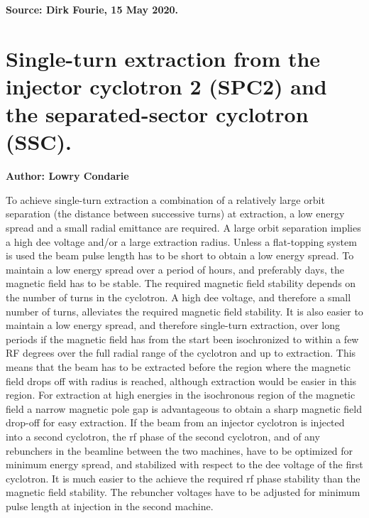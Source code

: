 \documentclass[11pt]{report}
\begin{document}
{\bf Source: Dirk Fourie, 15 May 2020.}

\newpage
\section{Single-turn extraction from the injector cyclotron 2 (SPC2) and the separated-sector cyclotron (SSC).}

{\bf Author: Lowry Condarie}

To achieve single-turn extraction a combination of a relatively large orbit separation (the distance between successive turns) at extraction, a low energy spread and a small radial emittance are required. A large orbit separation implies a high dee voltage and/or a large extraction radius.  Unless a flat-topping system is used the beam pulse length has to be short to obtain a low energy spread. To maintain a low energy spread over a period of hours, and preferably days, the magnetic field has to be stable. The required magnetic field stability depends on the number of turns in the cyclotron. A high dee voltage, and therefore a small number of turns, alleviates the required magnetic field stability. It is also easier to maintain a low energy spread, and therefore single-turn extraction, over long periods if the magnetic field has from the start been isochronized to within a few RF degrees over the full radial range of the cyclotron and up to extraction. This means that the beam has to be extracted before the 
region where the magnetic field drops off with radius is reached, although extraction would be easier in this region. For extraction at high energies in the isochronous region of the magnetic field a narrow magnetic pole gap is advantageous to obtain a sharp magnetic field drop-off for easy extraction. If the beam from an injector cyclotron is injected into a second cyclotron, the rf phase of the second cyclotron, and of any rebunchers in the beamline between the two machines, have to be optimized for minimum energy spread, and stabilized with respect to the dee voltage of the first cyclotron. It is much easier to the achieve the required rf phase stability than the magnetic field stability. The rebuncher voltages have to be adjusted for minimum pulse length at injection in the second machine.
\end{document}
